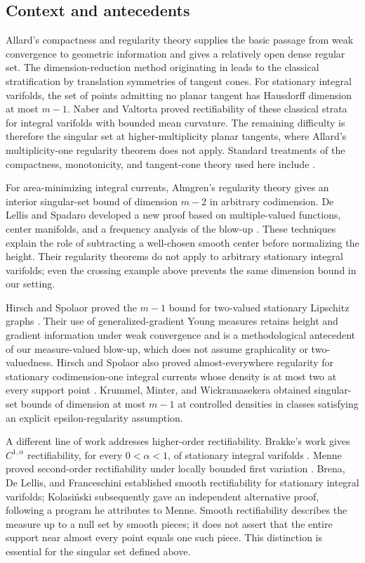 \subsection{Context and antecedents}
Allard's compactness and regularity theory \cite{Allard1972} supplies
the basic passage from weak convergence to geometric information and
gives a relatively open dense regular set. The dimension-reduction
method originating in \cite{Federer1970} leads to the classical
stratification by translation symmetries of tangent cones. For stationary
integral varifolds, the set of points admitting no planar tangent has
Hausdorff dimension at most $m-1$. Naber and Valtorta
\cite{NV2020} proved rectifiability of these classical strata for
integral varifolds with bounded mean curvature. The remaining difficulty
is therefore the singular set at higher-multiplicity planar tangents,
where Allard's multiplicity-one regularity theorem does not apply.
Standard treatments of the compactness, monotonicity, and tangent-cone
theory used here include \cite{Federer1969,Simon1983}.

For area-minimizing integral currents, Almgren's regularity theory
\cite{Almgren2000} gives an interior singular-set bound of dimension $m-2$ in
arbitrary codimension. De Lellis and Spadaro developed a new proof based
on multiple-valued functions, center manifolds, and a frequency analysis
of the blow-up \cite{DLS2011,DLS2016II,DLS2016III}.
These techniques explain the role of subtracting a well-chosen smooth
center before normalizing the height. Their regularity theorems do
not apply to arbitrary stationary integral varifolds; even the crossing
example above prevents the same dimension bound in our setting.

Hirsch and Spolaor proved the $m-1$ bound for two-valued stationary
Lipschitz graphs \cite{HSgraphs}. Their use of generalized-gradient
Young measures retains height and gradient information under weak
convergence and is a methodological antecedent of our measure-valued
blow-up, which does not assume graphicality or two-valuedness.
Hirsch and Spolaor also proved almost-everywhere regularity for stationary
codimension-one integral currents whose density is at most two at every support
point \cite{HS2025}. Krummel, Minter, and Wickramasekera
\cite{KMW2026} obtained singular-set bounds of dimension at most $m-1$ at
controlled densities in classes satisfying an explicit
epsilon-regularity assumption.

A different line of work addresses higher-order rectifiability.
Brakke's work gives $C^{1,\alpha}$ rectifiability, for every
$0<\alpha<1$, of stationary integral varifolds \cite{Brakke1978}.
Menne proved second-order rectifiability under locally bounded first
variation \cite{Menne2013}. Brena, De Lellis, and Franceschini
\cite{BDLF2025} established smooth rectifiability for stationary
integral varifolds; Kolasi\'nski \cite{Kolasinski2026} subsequently
gave an independent alternative proof, following a program he
attributes to Menne. Smooth rectifiability describes
the measure up to a null
set by smooth pieces; it does not assert that the entire support near
almost every point equals one such piece. This distinction is essential
for the singular set defined above.


